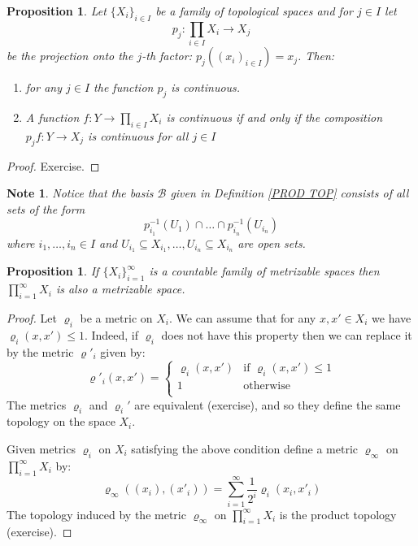 \documentclass[11pt, letterpaper, oneside]{report}
\theoremstyle{pplain}
\newtheorem{proposition}[theorem]{Proposition}
\newtheorem{ITERMVALUE THM}[theorem]{Intermediate Value Theorem}
\newtheorem{HEINEBOREL THM}[theorem]{Heine-Borel Theorem}
\newtheorem{UMETR THM}[theorem]{Urysohn Metrization Theorem}
\newtheorem{UMETR2 THM}[theorem]{Urysohn Metrization Theorem (v.2)}
\theoremstyle{ddefinition}
\newtheorem{note}[theorem]{Note}
\theoremstyle{nnn}
\newtheorem{TDA NN}[theorem]{Topological Data Analysis. }
\theoremstyle{eexercise}
\newcommand{\BB}{{\mathcal B}}
\newcommand{\benu}{\begin{enumerate}}
\newcommand{\eenu}{\end{enumerate}}
\begin{document}
\begin{proposition}
\label{UNIV PROP PROD PROP}
Let $\{X_{i}\}_{i\in I}$ be a family of topological spaces and for $j\in I$ let 
$$p_{j}\colon \prod_{i\in I} X_{i}  \to X_{j}$$
be the projection onto the $j$-th factor: $p_{j}((x_{i})_{i\in I}) = x_{j}$. Then: 
\benu 
\item for any $j\in I$ the function $p_{j}$ is continuous. 
\item A function $f\colon Y\to \prod_{i\in I}X_{i}$ is continuous if and only if the composition 
$p_{j}f\colon Y \to X_{j}$ is continuous for all $j\in I$
\eenu
\end{proposition}

\begin{proof}
Exercise. 
\end{proof}

\begin{note}
\label{PROD BASIS NOTE}
Notice that the basis $\BB$ given in Definition  \ref{PROD TOP}  consists of all sets of the form
$$p_{i_{1}}^{-1}(U_{1})\cap \dots \cap  p_{i_{n}}^{-1}(U_{i_{n}})$$
where $i_{1}, \dots, i_{n}\in I$ and 
 $U_{i_{1}}\subseteq X_{i_{1}}, \dots,  U_{i_{n}}\subseteq X_{i_{n}}$ are open  sets.    
\end{note}

\begin{proposition}
\label{CONTABLE PROD OF METRIC SP PROP}
If $\{X_{i}\}_{i=1}^{\infty}$ is a countable family of metrizable spaces then $\prod_{i=1}^{\infty} X_{i}$
is also a metrizable space. 
\end{proposition}

\begin{proof}
Let $\varrho_{i}$ be a metric on $X_{i}$. We can assume that for any $x, x'\in X_{i}$
we have $\varrho_{i}(x, x') \leq 1$. Indeed, if $\varrho_{i}$ does not have this property
then we can replace it by the metric $\varrho'_{i}$ given by:
$$
\varrho'_{i}(x, x') =
\begin{cases}
\varrho_{i}(x, x') & \text{if $\varrho_{i}(x, x') \leq 1$} \\
1 & \text{otherwise} \\
\end{cases}
$$
The metrics $\varrho_{i}$ and $\varrho_{i}'$ are equivalent (exercise), and so they define the
same topology on the space $X_{i}$.

Given metrics $\varrho_{i}$ on $X_{i}$ satisfying the above condition define a metric
$\varrho_{\infty}$ on $\prod_{i=1}^{\infty} X_{i}$ by:
$$\varrho_{\infty}((x_{i}), (x'_{i})) = \sum_{i=1}^{\infty} \frac{1}{2^{i}}\varrho_{i}(x_{i}, x'_{i})$$
The topology induced by the metric $\varrho_{\infty}$ on $\prod_{i=1}^{\infty}X_{i}$ is the 
product topology (exercise). 
\end{proof}
\end{document}

